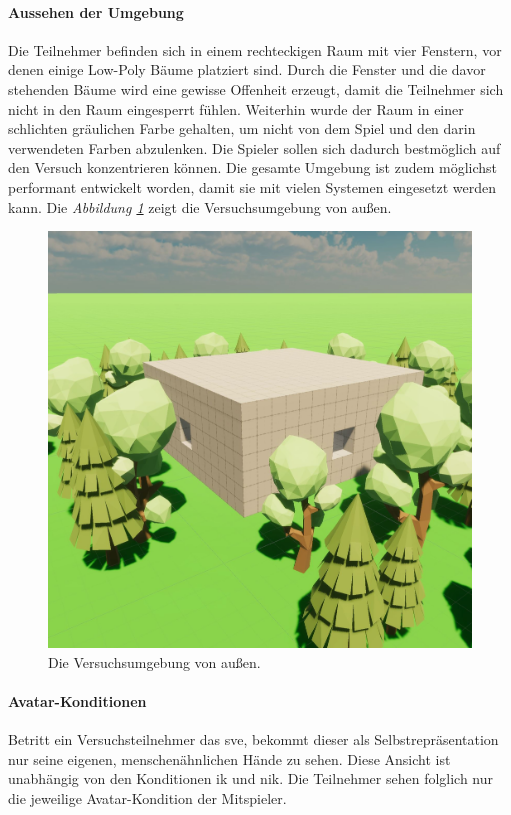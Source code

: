 \documentclass[a4paper,11pt]{article}%
\renewcommand{\\}{\vspace*{0.5\baselineskip} \newline}
\begin{document}
{{\paragraph{Aussehen der Umgebung}
Die Teilnehmer befinden sich in einem rechteckigen Raum mit vier Fenstern, vor denen einige Low-Poly Bäume platziert sind. Durch die Fenster und die davor stehenden Bäume wird eine gewisse Offenheit erzeugt, damit die Teilnehmer sich nicht in den Raum eingesperrt fühlen. Weiterhin wurde der Raum in einer schlichten gräulichen Farbe gehalten, um nicht von dem Spiel und den darin verwendeten Farben abzulenken. Die Spieler sollen sich dadurch bestmöglich auf den Versuch konzentrieren können. Die gesamte Umgebung ist zudem möglichst performant entwickelt worden, damit sie mit vielen Systemen eingesetzt werden kann. Die \textit{Abbildung \ref{Versuchsumgebung}} zeigt die Versuchsumgebung von außen.

\begin{figure}[H]
		\begin{footnotesize}
		\centering
			\includegraphics[scale=0.4]{Abbildungen/Versuchsumgebung/Raum.JPG}
			\caption[Die Versuchsumgebung von außen]{Die Versuchsumgebung von außen.}
			\label{Versuchsumgebung}
		\end{footnotesize}
	\end{figure}

\paragraph{Avatar-Konditionen}
Betritt ein Versuchsteilnehmer das \ac{sve}, bekommt dieser als Selbstrepräsentation nur seine eigenen, menschenähnlichen Hände zu sehen. Diese Ansicht ist unabhängig von den Konditionen \ac{ik} und \ac{nik}. Die Teilnehmer sehen folglich nur die jeweilige Avatar-Kondition der Mitspieler. 

}}
\end{document}
